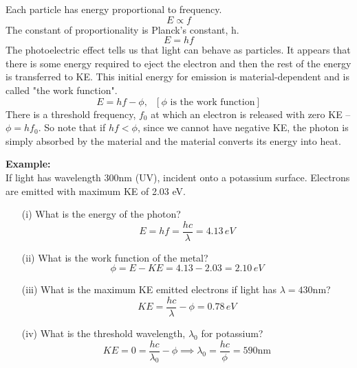 \documentclass[a4paper, 11pt, normalem]{report}
\begin{document}
Each particle has energy proportional to frequency.
\begin{equation}
    E \propto f
\end{equation}
The constant of proportionality is Planck's constant, h.
\begin{equation}
    E = hf
\end{equation}
The photoelectric effect tells us that light can behave as particles.
It appears that there is some energy required to eject the electron and then the rest of the energy is transferred to KE.
This initial energy for emission is material-dependent and is called "the work function".
\begin{equation}
    E = hf - \phi,~~~[\phi\text{ is the work function}]
\end{equation}
There is a threshold frequency, $f_{0}$ at which an electron is released with zero KE -- $\phi = hf_{0}$.
So note that if $hf < \phi$, since we cannot have negative KE, the photon is simply absorbed by the material and the material converts its energy into heat.

\textbf{Example:}\\
If light has wavelength 300nm (UV), incident onto a potassium surface.
Electrons are emitted with maximum KE of 2.03 eV.
\begin{itemize}
    \item[(i)] What is the energy of the photon?
        \begin{equation}
            E = hf = \frac{hc}{\lambda} = 4.13\,eV
        \end{equation}
    \item[(ii)] What is the work function of the metal?
        \begin{equation}
            \phi = E - KE = 4.13 - 2.03 = 2.10\,eV
        \end{equation}
    \item[(iii)] What is the maximum KE emitted electrons if light has $\lambda = 430$nm?
        \begin{equation}
            KE = \frac{hc}{\lambda} - \phi = 0.78\,eV
        \end{equation}
    \item[(iv)] What is the threshold wavelength, $\lambda_{0}$ for potassium?
        \begin{equation}
            KE = 0 = \frac{hc}{\lambda_{0}} - \phi \implies \lambda_{0} = \frac{hc}{\phi} = 590\text{nm}
        \end{equation}
\end{itemize}
\end{document}
